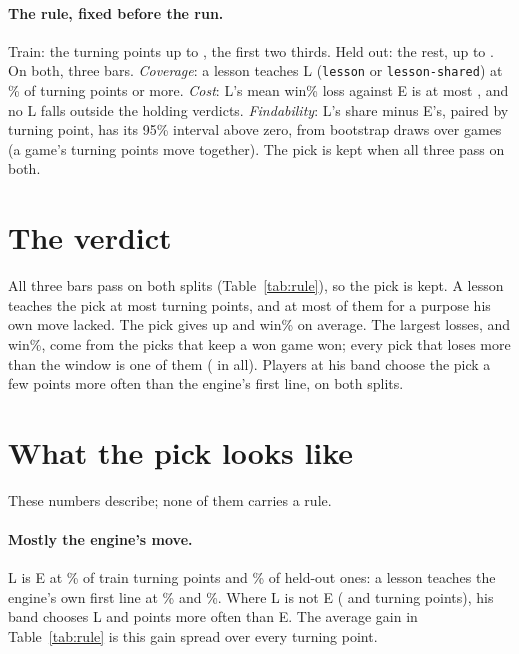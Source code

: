 \documentclass[11pt]{article}
\begin{document}
\paragraph{The rule, fixed before the run.} Train: the turning points up to \TrainUntil, the
first two thirds. Held out: the rest, up to \HeldoutUntil. On both, three bars. \emph{Coverage}:
a lesson teaches L (\texttt{lesson} or \texttt{lesson-shared}) at \CoverageBar\% of turning points
or more. \emph{Cost}: L's mean win\% loss against E is at most \CostBar, and no L falls outside the
holding verdicts. \emph{Findability}: L's share minus E's, paired by turning point, has its 95\%
interval above zero, from \Draws{} bootstrap draws over games (a game's turning points move
together). The pick is kept when all three pass on both.

\section{The verdict}

\RuleTable

All three bars pass on both splits (Table~\ref{tab:rule}), so the pick is kept. A lesson teaches
the pick at most turning points, and at most of them for a purpose his own move lacked. The pick
gives up \TrainCostMean{} and \HeldCostMean{} win\% on average. The largest losses, \TrainWorst{} and
\HeldWorst{} win\%, come from the \KeepsPicks{} picks that keep a won game won; every pick that
loses more than the window is one of them (\OverWindow{} in all). Players at his band choose the
pick a few points more often than the engine's first line, on both splits.

\section{What the pick looks like}

\PurposeTable

These numbers describe; none of them carries a rule.

\paragraph{Mostly the engine's move.} L is E at \TrainIsTop\% of train turning points and
\HeldIsTop\% of held-out ones: a lesson teaches the engine's own first line at \TrainTopTaught\%
and \HeldTopTaught\%. Where L is not E (\TrainDiffers{} and \HeldDiffers{} turning points), his
band chooses L \TrainGainWhere{} and \HeldGainWhere{} points more often than E. The average gain
in Table~\ref{tab:rule} is this gain spread over every turning point.
\end{document}
